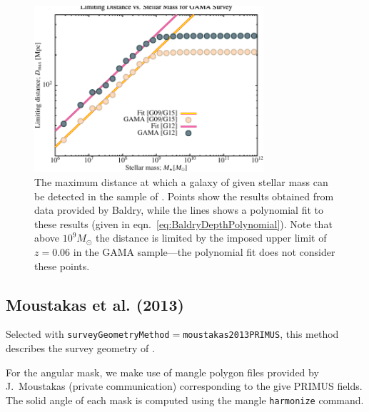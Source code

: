 \begin{figure}
 \begin{center}
 \includegraphics[width=85mm,trim=0mm 0mm 0mm 4mm,clip]{Plots/DataAnalysis/BaldryGAMAMassDistanceRelation.pdf}
 \end{center}
 \caption{The maximum distance at which a galaxy of given stellar mass can be detected in the sample of \protect\cite{baldry_galaxy_2012}. Points show the results obtained from data provided by Baldry, while the lines shows a polynomial fit to these results (given in eqn.~\ref{eq:BaldryDepthPolynomial}). Note that above $10^9M_\odot$ the distance is limited by the imposed upper limit of $z=0.06$ in the GAMA sample---the polynomial fit does not consider these points.}
 \label{fig:BaldryGAMADepthFit}
\end{figure}

\subsection{Moustakas et al. (2013)}\label{phys:surveyGeometry:surveyGeometryMoustakas2013PRIMUS}

Selected with {\tt surveyGeometryMethod}$=${\tt moustakas2013PRIMUS}, this method describes the survey geometry of \cite{moustakas_primus:_2013}. 

For the angular mask, we make use of \gls{mangle} polygon files provided by J.~Moustakas (private communication)  corresponding to the give PRIMUS fields. The solid angle of each mask is computed using the \gls{mangle} {\tt harmonize} command.

